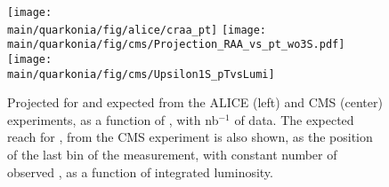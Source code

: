 \documentclass[../report.tex]{subfiles}
\providecommand{\main}{..}
\begin{document}
% 

\begin{figure}
\begin{center}
 \texttt{[image: \\main/quarkonia/fig/alice/craa\_pt]}
 \texttt{[image: \\main/quarkonia/fig/cms/Projection\_RAA\_vs\_pt\_wo3S.pdf]}
 \texttt{[image: \\main/quarkonia/fig/cms/Upsilon1S\_pTvsLumi]}
\end{center}

 \caption{Projected \raa for  and  expected from the ALICE (left) and CMS (center) experiments, as a function of \pt, with \unit[10]{nb}$^{-1}$ of \PbPb data. The expected \pt reach for , from the CMS experiment is
 also shown, as the position of the last \pt bin of the measurement, with constant number of observed , as a function of integrated luminosity.
 }
 \label{fig:upsi_raa_pt}
\end{figure}
\end{document}
